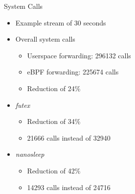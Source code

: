 \documentclass[shortpres,aspectratio=43]{beamer}
\newlength{\mylength}
\begin{document}
\begin{frame}{System Calls}
    \begin{minipage}{0.43\textwidth}
        \begin{itemize}
            \item Example stream of 30 seconds
            \vspace{2\mylength}
            \item Overall system calls 
            \vspace{2\mylength}
            \begin{itemize}
                \item Userspace forwarding: 296132 calls
                \vspace{2\mylength}
                \item eBPF forwarding: 225674 calls
                \vspace{2\mylength}
                \item Reduction of 24\%
            \end{itemize}
        \end{itemize}
    \end{minipage}\hfill
    \begin{minipage}{0.51\textwidth}
        \begin{itemize}
            \item \textit{futex}
            \vspace{2\mylength}
            \begin{itemize}
                \item Reduction of 34\%
                \vspace{2\mylength}
                \item 21666 calls instead of 32940
            \end{itemize}
            \vspace{2\mylength}
            \item \textit{nanosleep}
            \vspace{2\mylength}
            \begin{itemize}
                \item Reduction of 42\%
                \vspace{2\mylength}
                \item 14293 calls instead of 24716
            \end{itemize}
            \vspace{2\mylength}

\end{itemize}
\end{minipage}
\end{frame}
\end{document}
